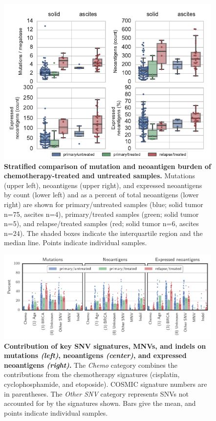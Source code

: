 \begin{figure}
\centering
\includegraphics[scale=1.0]{figures/counts.pdf}
\caption{\textbf{Stratified comparison of mutation and neoantigen burden of chemotherapy-treated and untreated samples.} Mutations (upper left), neoantigens (upper right), and expressed neoantigens by count (lower left) and as a percent of total neoantigens (lower right) are shown for primary/untreated samples (blue; solid tumor n=75, ascites n=4), primary/treated samples (green; solid tumor n=5), and relapse/treated samples (red; solid tumor n=6, ascites n=24). The shaded boxes indicate the interquartile region and the median line. Points indicate individual samples.}
\label{fig:counts}
\end{figure}


\begin{figure}[htbp]
\centering
\includegraphics[scale=1.0]{figures/sources_of_mutations_and_neoantigens.pdf}
\caption{\textbf{Contribution of key SNV signatures, MNVs, and indels on mutations \textit{(left)}, neoantigens \textit{(center)}, and expressed neoantigens \textit{(right)}.} The \textit{Chemo} category combines the contributions from the chemotherapy signatures (cisplatin, cyclophosphamide, and etoposide). COSMIC signature numbers are in parentheses. The \textit{Other SNV} category represents SNVs not accounted for by the signatures shown. Bars give the mean, and points indicate individual samples.}
\label{fig:sources}
\end{figure}


